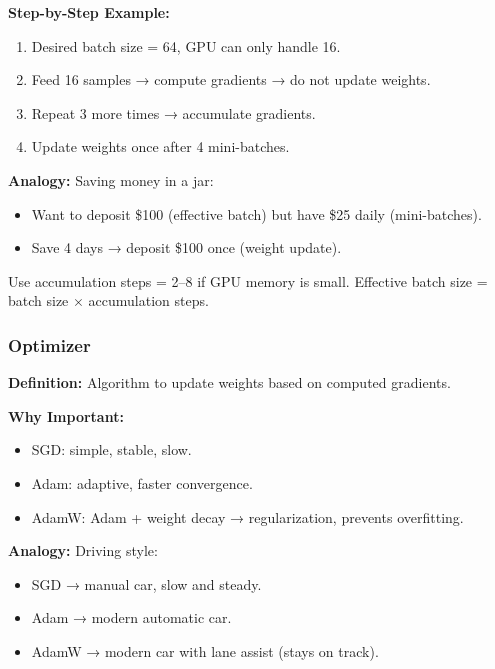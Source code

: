 \textbf{Step-by-Step Example:}
\begin{enumerate}
    \item Desired batch size = 64, GPU can only handle 16.  
    \item Feed 16 samples → compute gradients → do not update weights.  
    \item Repeat 3 more times → accumulate gradients.  
    \item Update weights once after 4 mini-batches.  
\end{enumerate}

\textbf{Analogy:} Saving money in a jar:  
\begin{itemize}
    \item Want to deposit \$100 (effective batch) but have \$25 daily (mini-batches).  
    \item Save 4 days → deposit \$100 once (weight update).  
\end{itemize}

\begin{tcolorbox}[colback=purple!5,colframe=purple!70!black,title=Rule of Thumb]
Use accumulation steps = 2--8 if GPU memory is small.  
Effective batch size = batch size $\times$ accumulation steps.
\end{tcolorbox}



\subsubsection{Optimizer}
\textbf{Definition:} Algorithm to update weights based on computed gradients.  

\textbf{Why Important:}  
\begin{itemize}
    \item SGD: simple, stable, slow.  
    \item Adam: adaptive, faster convergence.  
    \item AdamW: Adam + weight decay → regularization, prevents overfitting.  
\end{itemize}

\textbf{Analogy:} Driving style:  
\begin{itemize}
    \item SGD → manual car, slow and steady.  
    \item Adam → modern automatic car.  
    \item AdamW → modern car with lane assist (stays on track).  
\end{itemize}

